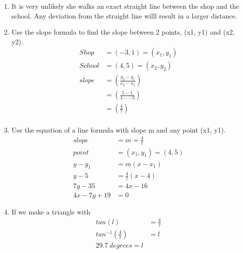 \documentclass[11pt]{article}
\begin{document}
\begin{enumerate}
\begin{enumerate}
            \item It is very unlikely she walks an exact straight line between the shop and the school. Any deviation from the straight line willl result in a larger distance.

            \item Use the slope formula to find the slope between 2 points, (x1, y1) and (x2, y2).
            \begin{equation*}
                \begin{split}
                    Shop&=(-3,1)=(x_{1},y_{1})\\
                    School&=(4,5)=(x_{2},y_{2})\\
                    slope&=(\frac{y_{2}-y_{1}}{x_{2}-x_{1}})\\
                    &=(\frac{5-1}{4--3})\\
                    &=(\frac{4}{7})\\
                \end{split}
            \end{equation*}

            \item Use the equation of a line formula with slope m and any point (x1, y1).
            \begin{equation*}
                \begin{split}
                    slope &= m = \frac{4}{7}\\
                    point &= (x_{1},y_{1}) = (4,5)\\
                    y-y_{1}&=m(x-x_{1})\\
                    y-5&=\frac{4}{7}(x-4)\\
                    7y-35&=4x-16\\
                    4x-7y+19&=0
                \end{split}
            \end{equation*}

            \item If we make a triangle with 
            \begin{equation*}
                \begin{split}
                    tan(l)&=\frac{4}{7}\\
                    tan^{-1}(\frac{4}{7})&=l\\
                    29.7\ degrees=l
                \end{split}
            \end{equation*}
        \end{enumerate}


\end{enumerate}
\end{document}
